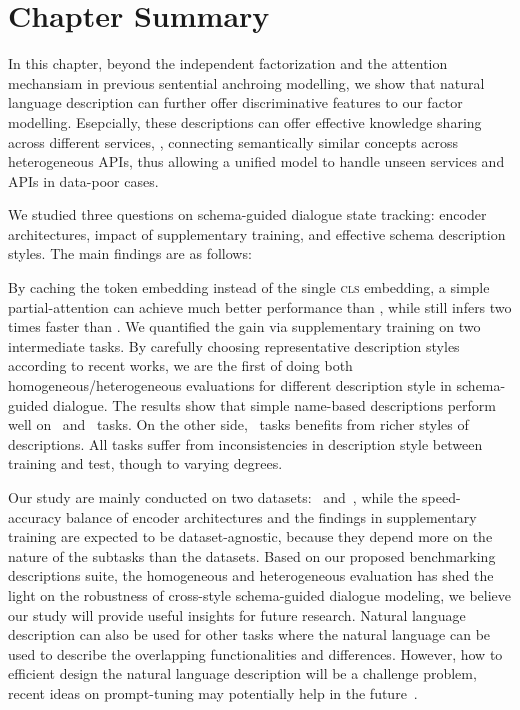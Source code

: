 \section{Chapter Summary}
\label{sec:conclusion}
In this chapter, beyond the independent factorization and the
attention mechansiam in previous sentential anchroing modelling, we
show that natural language description can further offer
discriminative features to our factor modelling. Esepcially, these
descriptions can offer effective knowledge sharing across different
services, \eg, connecting semantically similar concepts across
heterogeneous APIs, thus allowing a unified model to handle unseen
services and APIs in data-poor cases.

We studied three questions on schema-guided dialogue state tracking:
encoder architectures, impact of supplementary training, and effective
schema description styles.  The main findings are as follows:

By caching the token embedding instead of the single \textsc{cls}
embedding, a simple partial-attention \FE can achieve much better
performance than \DE, while still infers two times faster than \CE.
We quantified the gain via supplementary training on two intermediate
tasks.  By carefully choosing representative description styles
according to recent works, we are the first of doing both
homogeneous/heterogeneous evaluations for different description style
in schema-guided dialogue. The results show that simple name-based
descriptions perform well on \IC~and \RSI~tasks. On the other side, \NSL~tasks
benefits from richer styles of descriptions.  All tasks suffer from
inconsistencies in description style between training and test, though
to varying degrees.

Our study are mainly conducted on two datasets: \sgdst~and~\multiwoz,
while the speed-accuracy balance of encoder architectures and the
findings in supplementary training are expected to be
dataset-agnostic, because they depend more on the nature of the
subtasks than the datasets. Based on our proposed benchmarking
descriptions suite, the homogeneous and heterogeneous evaluation has
shed the light on the robustness of cross-style schema-guided dialogue
modeling, we believe our study will provide useful insights for future
research. Natural language description can also be used for other
tasks where the natural language can be used to describe the
overlapping functionalities and differences. However, how to efficient
design the natural language description will be a challenge problem,
recent ideas on prompt-tuning may potentially help in the
future~\citep{schucher2022power,ye2022ontology}.



